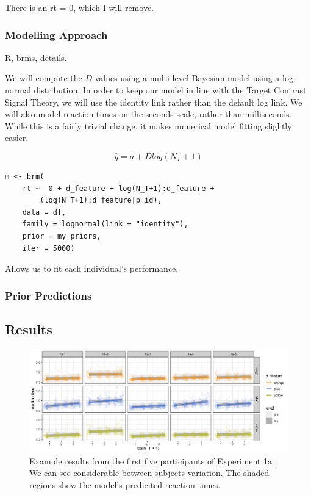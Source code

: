 \documentclass[smallextended]{svjour3}       %
\begin{document}
There is an rt = 0, which I will remove. 

\subsubsection{Modelling Approach}

R, brms, details.

We will compute the $D$ values using a multi-level Bayesian model using a log-normal distribution. In order to keep our model in line with the Target Contrast Signal Theory, we will use the identity link rather than the default log link. We will also model reaction times on the seconds scale, rather than milliseconds. While this is a fairly trivial change, it makes numerical model fitting slightly easier. 

\begin{equation}
\hat{y} = a + Dlog(N_T + 1)
\label{eq:computeDlm}
\end{equation}

\begin{verbatim}
m <- brm(
    rt ~  0 + d_feature + log(N_T+1):d_feature + 
    	(log(N_T+1):d_feature|p_id),
    data = df,
    family = lognormal(link = "identity"),
    prior = my_priors,
    iter = 5000)
\end{verbatim}

Allows us to fit each individual's performance.



\subsubsection{Prior Predictions}

\subsection{Results}


\begin{figure}
\centering
\includegraphics[width=\textwidth]{../reanalyse_Buetti2019/exp1_fits.png}
\caption{Example results from the first five participants of Experiment 1a \cite{buetti2019predicting}. We can see considerable between-subjects variation. The shaded regions show the model's predicited reaction times.}
\label{fig:buetti2019_a1}
\end{figure}
\end{document}
